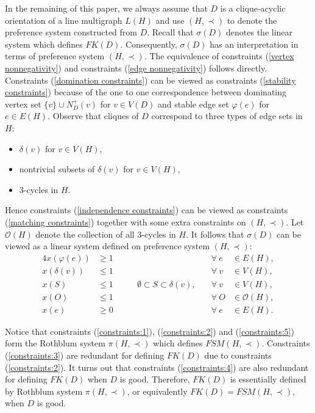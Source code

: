 \documentclass[11pt]{article}
\numberwithin{theorem}{section}
\begin{document}
In the remaining of this paper, we always assume that $D$ is a clique-acyclic orientation of a line multigraph $L(H)$ and use $(H,\prec)$ to denote the preference system constructed from $D$. Recall that $\sigma(D)$ denotes the linear system which defines $FK(D)$. Consequently, $\sigma(D)$ has an interpretation in terms of preference system $(H,\prec)$. The equivalence of constraints (\ref{vertex nonnegativity}) and constraints (\ref{edge nonnegativity}) follows directly. Constraints (\ref{domination constraints}) can be viewed as constraints (\ref{stability constraints}) because of the one to one correspondence between dominating vertex set $\{v\}\cup N^+_D(v)$ for $v\in V(D)$ and stable edge set $\varphi(e)$ for $e\in E(H)$.
Observe that cliques of $D$ correspond to three types of edge sets in $H$:
\begin{itemize}
\item $\delta(v)$ for $v\in V(H)$,
\item nontrivial subsets of $\delta(v)$ for $v\in V(H)$,
\item 3-cycles in $H$.
\end{itemize}
Hence constraints (\ref{independence constraints}) can be viewed as constraints (\ref{matching constraints}) together with some extra constraints on $(H,\prec)$. Let $\mathcal{O}(H)$ denote the collection of all $3$-cycles in $H$. It follows that $\sigma(D)$ can be viewed as a linear system defined on preference system $(H,\prec)$:
\begin{alignat}{4}
x(\varphi(e)) &\geq 1 &\qquad &\forall ~e &\in E(H),\label{constraints:1}\\
x(\delta(v)) &\leq 1 &\qquad &\forall ~v &\in V(H),\label{constraints:2}\\
x(S) &\leq 1 &\qquad \emptyset\subset S\subset \delta(v),\quad &\forall ~v&\in V(H),\label{constraints:3}\\
x(O) &\leq 1 &\qquad &\forall ~O&\in \mathcal{O}(H),\label{constraints:4}\\
x(e) &\geq 0 &\qquad &\forall ~e &\in E(H)\label{constraints:5}.
\end{alignat}

Notice that constraints (\ref{constraints:1}), (\ref{constraints:2}) and (\ref{constraints:5}) form the Rothblum system $\pi(H,\prec)$ which defines $FSM(H,\prec)$. Constraints (\ref{constraints:3}) are redundant for defining $FK(D)$ due to constraints (\ref{constraints:2}). It turns out that constraints (\ref{constraints:4}) are also redundant for defining $FK(D)$ when $D$ is good. Therefore, $FK(D)$ is essentially defined by Rothblum system $\pi(H,\prec)$, or equivalently $FK(D)=FSM(H,\prec)$, when $D$ is good.
\end{document}
